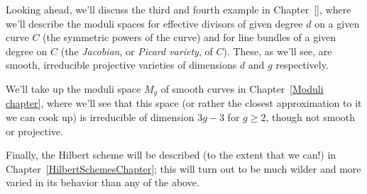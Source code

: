 Looking ahead, we'll discuss the third and fourth example in Chapter~\ref{}, where we'll describe the moduli spaces for effective divisors of given degree $d$ on a given curve $C$ (the symmetric powers of the curve) and for line bundles of a given degree on $C$ (the \emph{Jacobian}, or \emph{Picard variety}, of $C$). These, as we'll see, are smooth, irreducible projective varieties of dimensions $d$ and $g$ respectively.

We'll take up the moduli space $M_g$ of smooth curves in Chapter~\ref{Moduli chapter}, where we'll see that this space (or rather the closest approximation to it we can cook up) is irreducible of dimension $3g-3$ for $g \geq 2$, though not smooth or projective.

Finally, the Hilbert scheme will be described (to the extent that we can!) in Chapter~\ref{HilbertSchemesChapter}; this will turn out to be much wilder and more varied in its behavior than any of the above.




